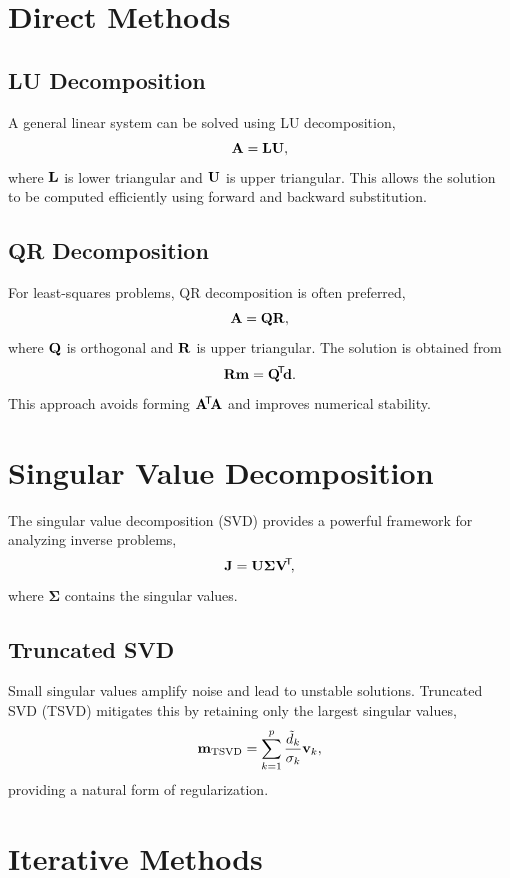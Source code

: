 \section{Direct Methods}

\subsection{LU Decomposition}

A general linear system can be solved using LU decomposition,
\[
    \vb{A} = \vb{L}\vb{U},
\]
where $\vb{L}$ is lower triangular and $\vb{U}$ is upper triangular. This allows the solution to be computed efficiently using forward and backward substitution.

\subsection{QR Decomposition}

For least-squares problems, QR decomposition is often preferred,
\[
    \vb{A} = \vb{Q}\vb{R},
\]
where $\vb{Q}$ is orthogonal and $\vb{R}$ is upper triangular. The solution is obtained from
\[
    \vb{R} \vb{m} = \vb{Q}\!^\mathsf{T}\! \vb{d}.
\]
This approach avoids forming $\vb{A}\!^\mathsf{T}\! \vb{A}$ and improves numerical stability.

\section{Singular Value Decomposition}

The singular value decomposition (SVD) provides a powerful framework for analyzing inverse problems,
\[
    \vb{J} = \vb{U} \boldsymbol{\Sigma} \vb{V}\!^\mathsf{T}\!,
\]
where $\boldsymbol{\Sigma}$ contains the singular values.

\subsection{Truncated SVD}

Small singular values amplify noise and lead to unstable solutions. Truncated SVD (TSVD) mitigates this by retaining only the largest singular values,
\[
    \vb{m}_{\text{TSVD}} = \sum_{k=1}^{p} \frac{\tilde{d}_k}{\sigma_k} \vb{v}_k,
\]
providing a natural form of regularization.

\section{Iterative Methods}

